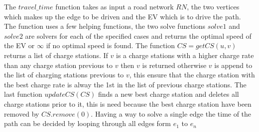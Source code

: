 The $travel\_time$ function takes as input a road network $RN$, the two vertices which makes up the edge to be driven and the EV which is to drive the path. The function uses a few helping functions, the two solve functions $solve1$ and $solve2$ are solvers for each of the specified cases and returns the optimal speed of the EV or $\infty$ if no optimal speed is found. The function $CS = getCS(u, v)$ returns a list of charge stations. If $v$ is a charge stations with a higher charge rate than any charge station previous to $v$ then $v$ is returned otherwise $v$ is append to the list of charging stations previous to $v$, this ensure that the charge station with the best charge rate is alway the 1st in the list of previous charge stations. The last function $updateCS(CS)$ finds a new best charge station and deletes all charge stations prior to it, this is need because the best charge station have been removed by $CS.remove(0)$. Having a way to solve a single edge the time of the path can be decided by looping through all edges form $e_1$ to $e_n$  


